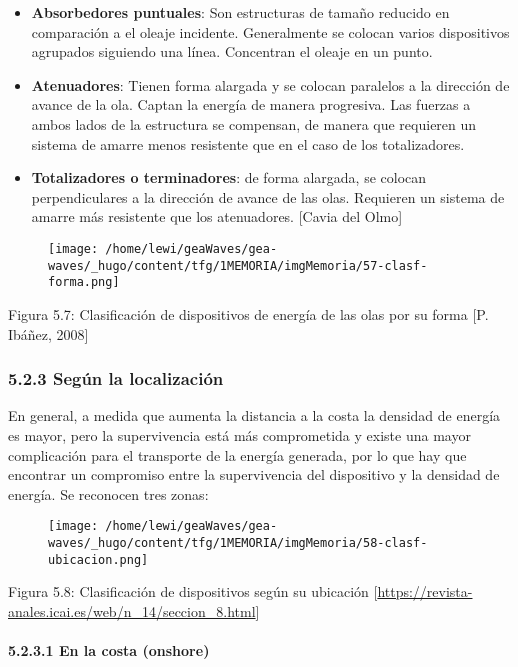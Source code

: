 \begin{itemize}
\item
  \textbf{Absorbedores puntuales}: Son estructuras de tamaño reducido en
  comparación a el oleaje incidente. Generalmente se colocan varios
  dispositivos agrupados siguiendo una línea. Concentran el oleaje en un
  punto. 
\item
  \textbf{Atenuadores}: Tienen forma alargada y se colocan paralelos a
  la dirección de avance de la ola. Captan la energía de manera
  progresiva. Las fuerzas a ambos lados de la estructura se compensan,
  de manera que requieren un sistema de amarre menos resistente que en
  el caso de los totalizadores. 
\item
  \textbf{Totalizadores o terminadores}: de forma alargada, se colocan
  perpendiculares a la dirección de avance de las olas. Requieren un
  sistema de amarre más resistente que los atenuadores. {[}Cavia del
  Olmo{]}
\end{itemize}

\begin{figure}
\centering
\texttt{[image: /home/lewi/geaWaves/gea-waves/\_hugo/content/tfg/1MEMORIA/imgMemoria/57-clasf-forma.png]}
\caption{}
\end{figure}

Figura 5.7: Clasificación de dispositivos de energía de las olas por su
forma {[}P. Ibáñez, 2008{]}

\subsubsection{5.2.3 Según la localización}\label{header-n123}

En general, a medida que aumenta la distancia a la costa la densidad de
energía es mayor, pero la supervivencia está más comprometida y existe
una mayor complicación para el transporte de la energía generada, por lo
que hay que encontrar un compromiso entre la supervivencia del
dispositivo y la densidad de energía. Se reconocen tres zonas:

\begin{figure}
\centering
\texttt{[image: /home/lewi/geaWaves/gea-waves/\_hugo/content/tfg/1MEMORIA/imgMemoria/58-clasf-ubicacion.png]}
\caption{}
\end{figure}

Figura 5.8: Clasificación de dispositivos según su ubicación
{[}\url{https://revista-anales.icai.es/web/n_14/seccion_8.html}{]}

\paragraph{5.2.3.1 En la costa (onshore)}\label{header-n130}

